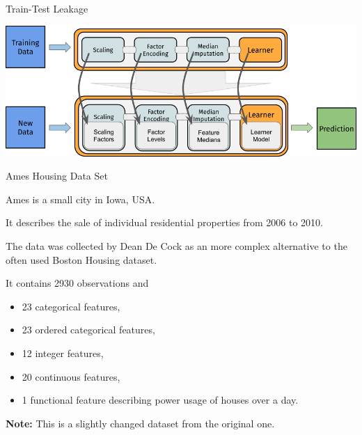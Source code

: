 \documentclass[11pt,compress,t,notes=noshow, xcolor=table]{beamer}
\begin{document}

\begin{vbframe}{Train-Test Leakage}

\vfill

\begin{center}
\includegraphics[width=\textwidth]{figure_man/pipe_action.png}
\end{center}

\vfill

\end{vbframe}


\begin{vbframe}{Ames Housing Data Set}

Ames is a small city in Iowa, USA.

It describes the sale of individual residential properties from 2006 to 2010.

The data was collected by Dean De Cock as an more complex alternative to the often used Boston Housing dataset.

It contains 2930 observations and

\begin{itemize}
\item 23 categorical features,
\item 23 ordered categorical features,
\item 12 integer features,
\item 20 continuous features,
\item 1 functional feature describing power usage of houses over a day.
\end{itemize}

\textbf{Note:} This is a slightly changed dataset from the original one.

\end{vbframe}

\end{document}
